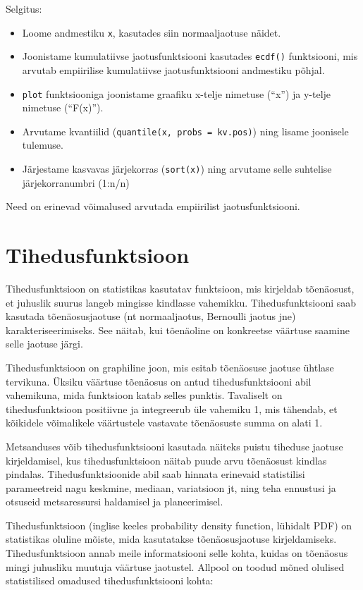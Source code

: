 \documentclass[
]{book}
\providecommand{\tightlist}{%
  \setlength{\itemsep}{0pt}\setlength{\parskip}{0pt}}
\begin{document}
Selgitus:

\begin{itemize}
\tightlist
\item
  Loome andmestiku \texttt{x}, kasutades siin normaaljaotuse näidet.
\item
  Joonistame kumulatiivse jaotusfunktsiooni kasutades \texttt{ecdf()} funktsiooni, mis arvutab empiirilise kumulatiivse jaotusfunktsiooni andmestiku põhjal.
\item
  \texttt{plot} funktsiooniga joonistame graafiku x-telje nimetuse (``x'') ja y-telje nimetuse (``F(x)'').
\item
  Arvutame kvantiilid (\texttt{quantile(x,\ probs\ =\ kv.pos)}) ning lisame joonisele tulemuse.
\item
  Järjestame kasvavas järjekorras (\texttt{sort(x)}) ning arvutame selle suhtelise järjekorranumbri (1:n/n)
\end{itemize}

Need on erinevad võimalused arvutada empiirilist jaotusfunktsiooni.

\section{Tihedusfunktsioon}\label{tihedusfunktsioon}

Tihedusfunktsioon on statistikas kasutatav funktsioon, mis kirjeldab tõenäosust, et juhuslik suurus langeb mingisse kindlasse vahemikku. Tihedusfunktsiooni saab kasutada tõenäosusjaotuse (nt normaaljaotus, Bernoulli jaotus jne) karakteriseerimiseks. See näitab, kui tõenäoline on konkreetse väärtuse saamine selle jaotuse järgi.

Tihedusfunktsioon on graphiline joon, mis esitab tõenäosuse jaotuse ühtlase tervikuna. Üksiku väärtuse tõenäosus on antud tihedusfunktsiooni abil vahemikuna, mida funktsioon katab selles punktis. Tavaliselt on tihedusfunktsioon positiivne ja integreerub üle vahemiku 1, mis tähendab, et kõikidele võimalikele väärtustele vastavate tõenäosuste summa on alati 1.

Metsanduses võib tihedusfunktsiooni kasutada näiteks puistu tiheduse jaotuse kirjeldamisel, kus tihedusfunktsioon näitab puude arvu tõenäosust kindlas pindalas. Tihedusfunktsioonide abil saab hinnata erinevaid statistilisi parameetreid nagu keskmine, mediaan, variatsioon jt, ning teha ennustusi ja otsuseid metsaressursi haldamisel ja planeerimisel.

Tihedusfunktsioon (inglise keeles probability density function, lühidalt PDF) on statistikas oluline mõiste, mida kasutatakse tõenäosusjaotuse kirjeldamiseks. Tihedusfunktsioon annab meile informatsiooni selle kohta, kuidas on tõenäosus mingi juhusliku muutuja väärtuse jaotustel. Allpool on toodud mõned olulised statistilised omadused tihedusfunktsiooni kohta:
\end{document}

